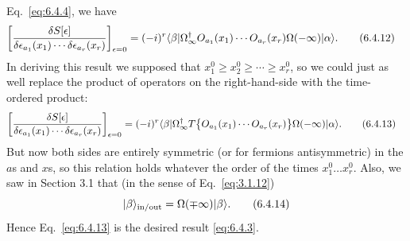 
Eq.~\eqref{eq:6.4.4}, we have
\begin{align}
\left[
  \frac{\delta S[\epsilon]}
  {\delta\epsilon_{a_1}(x_1)\cdots\delta\epsilon_{a_r}(x_r)}
\right]_{\epsilon=0}
={}&(-i)^r
\langle \beta\rvert\Omega^\dagger_{\infty}
O_{a_1}(x_1)\cdots O_{a_r}(x_r)
\Omega(-\infty)\lvert \alpha\rangle.
\tag{6.4.12}
\label{eq:6.4.12}
\end{align}
In deriving this result we supposed that
$x_1^0\geq x_2^0\geq\cdots\geq x_r^0$, so we could just as well replace
the product of operators on the right-hand-side with the time-ordered
product:
\begin{align}
\left[
  \frac{\delta S[\epsilon]}
  {\delta\epsilon_{a_1}(x_1)\cdots\delta\epsilon_{a_r}(x_r)}
\right]_{\epsilon=0}
={}&(-i)^r
\langle \beta\rvert\Omega^\dagger_{\infty}
T\bigl\{O_{a_1}(x_1)\cdots O_{a_r}(x_r)\bigr\}
\Omega(-\infty)\lvert \alpha\rangle.
\tag{6.4.13}
\label{eq:6.4.13}
\end{align}
But now both sides are entirely symmetric (or for fermions antisymmetric)
in the $a$s and $x$s, so this relation holds whatever the order of the times
$x_1^0\ldots x_r^0$. Also, we saw in Section 3.1 that (in the sense of
Eq.~\eqref{eq:3.1.12})
\begin{equation}
\lvert \beta\rangle_{\mathrm{in/out}}=\Omega(\mp\infty)\lvert \beta\rangle.
\tag{6.4.14}
\label{eq:6.4.14}
\end{equation}
Hence Eq.~\eqref{eq:6.4.13} is the desired result \eqref{eq:6.4.3}.


